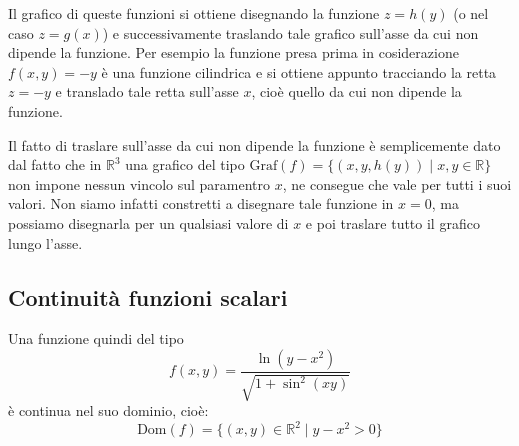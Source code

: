Il grafico di queste funzioni si ottiene disegnando la funzione $z = h(y)$ (o 
nel caso $z = g(x)$) e successivamente traslando tale grafico sull'asse da cui 
non dipende la funzione. Per esempio la funzione presa prima in cosiderazione 
$f(x, y) = -y$ è una funzione cilindrica e si ottiene appunto tracciando la 
retta $z = -y$ e translado tale retta sull'asse $x$, cioè quello da cui non 
dipende la funzione. %

Il fatto di traslare sull'asse da cui non dipende la funzione è semplicemente 
dato dal fatto che in $\mathbb{R}^3$ una grafico del tipo $\text{Graf}(f) = 
\{(x, y, h(y)) \;|\; x, y \in \mathbb{R}\}$ non impone nessun vincolo sul 
paramentro $x$, ne consegue che vale per tutti i suoi valori. Non siamo 
infatti constretti a disegnare tale funzione in $x = 0$, ma possiamo 
disegnarla per un qualsiasi valore di $x$ e poi traslare tutto il grafico 
lungo l'asse.

\subsection{Continuità funzioni scalari}
Una funzione quindi del tipo
\begin{equation*}
	f(x, y) = \dfrac{\ln(y -x^2)}{\sqrt{1+\sin^2(xy)}}
\end{equation*}
è continua nel suo dominio, cioè:
\begin{equation*}
	\text{Dom}(f) = \{(x, y) \in \mathbb{R}^2 \;|\; y - x^2 > 0\}
\end{equation*}

